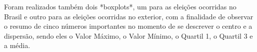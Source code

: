 \documentclass{article}
\begin{document}
Foram realizados também dois *boxplots*, um para as eleições ocorridas no Brasil e outro para as eleições ocorridas no exterior, com a finalidade de observar o resumo de cinco números importantes no momento de se descrever o centro e a dispersão, sendo eles o Valor Máximo, o Valor Mínimo, o Quartil 1, o Quartil 3 e a média.
\end{document}
